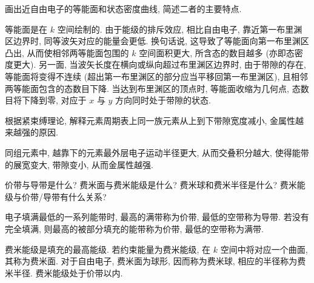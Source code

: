 \documentclass[UTF8]{ctexart}
\newenvironment{Answer}{}{}
\begin{document}
\begin{Question}
            \item 画出近自由电子的等能面和状态密度曲线, 简述二者的主要特点.

\begin{Answer}
    \begin{Solve}[Solve:]
        \hspace*{2em}等能面是在 $k$ 空间绘制的. 由于能级的排斥效应, 相比自由电子, 靠近第一布里渊区边界时, 同等波矢对应的能量会更低. 换句话说, 这导致了等能面向第一布里渊区凸出, 从而使相邻两等能面包围的 $k$ 空间面积更大, 所含态的数目越多 (亦即态密度更大). 另一面, 当波矢长度在横向或纵向超过布里渊区边界时, 由于带隙的存在, 等能面将变得不连续 (超出第一布里渊区的部分应当平移回第一布里渊区), 且相邻两等能面包含的态数目下降. 当达到布里渊区的顶点时, 等能面收缩为几何点, 态数目将下降到零, 对应于 $x$ 与 $y$ 方向同时处于带隙的状态.
    \end{Solve}
\end{Answer}

            \item 根据紧束缚理论, 解释元素周期表上同一族元素从上到下带隙宽度减小, 金属性越来越强的原因.

\begin{Answer}
    \begin{Solve}[Solve:]
        \hspace*{2em}同组元素中, 越靠下的元素最外层电子运动半径更大, 从而交叠积分越大, 使得能带的展宽变大, 带隙变小, 从而金属性越强.
    \end{Solve}
\end{Answer}

            \item 价带与导带是什么? 费米面与费米能级是什么? 费米球和费米半径是什么? 费米能级与价带/导带有什么关系?

\begin{Answer}
    \begin{Solve}[Solve:]
        \hspace*{2em}电子填满最低的一系列能带时, 最高的满带称为价带, 最低的空带称为导带. 若没有完全填满, 则最高的被部分填充的能带称为价带, 最低的空带称为满带.

        \hspace*{2em}费米能级是填充的最高能级. 若约束能量为费米能级, 在 $k$ 空间中将对应一个曲面, 其称为费米面. 对于自由电子, 费米面为球形, 因而称为费米球, 相应的半径称为费米半径. 费米能级处于价带以内.
    \end{Solve}
\end{Answer}

        \end{Question}
\end{document}
